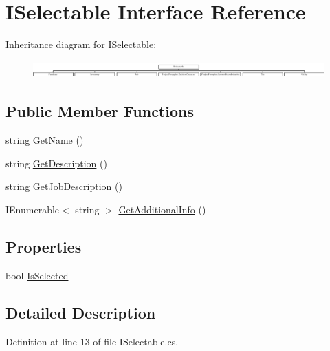 \hypertarget{interface_i_selectable}{}\section{I\+Selectable Interface Reference}
\label{interface_i_selectable}
Inheritance diagram for I\+Selectable\+:\begin{figure}[H]
\begin{center}
\leavevmode
\includegraphics[height=0.653061cm]{interface_i_selectable}
\end{center}
\end{figure}
\subsection*{Public Member Functions}
\begin{DoxyCompactItemize}
\item 
string \hyperlink{interface_i_selectable_af676ba50e2cd5839438d3092743a79da}{Get\+Name} ()
\item 
string \hyperlink{interface_i_selectable_a1d8947a443b6214cff01f2d75c8bc75a}{Get\+Description} ()
\item 
string \hyperlink{interface_i_selectable_a4d0f9fa51a3d70a7fbcbb39e126e4c73}{Get\+Job\+Description} ()
\item 
I\+Enumerable$<$ string $>$ \hyperlink{interface_i_selectable_a337f81bfa99bb254bb2f7de6a8b5cd4b}{Get\+Additional\+Info} ()
\end{DoxyCompactItemize}
\subsection*{Properties}
\begin{DoxyCompactItemize}
\item 
bool \hyperlink{interface_i_selectable_a52eadd6ad90b4dcb9073f4488b0b137f}{Is\+Selected}
\end{DoxyCompactItemize}


\subsection{Detailed Description}


Definition at line 13 of file I\+Selectable.\+cs.



